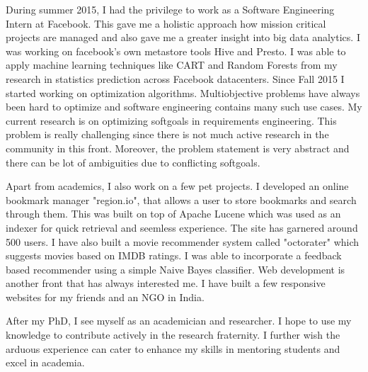 \documentclass{article}
\begin{document}
\bigskip
During summer 2015, I had the privilege to work as a Software Engineering Intern at Facebook. This gave me a holistic approach how mission critical projects are managed and also gave me a greater insight into big data analytics. I was working on facebook's own metastore tools Hive and Presto. I was able to apply machine learning techniques like CART and Random Forests from my research in statistics prediction across Facebook datacenters. Since Fall 2015 I started working on optimization algorithms. Multiobjective problems have always been hard to optimize and software engineering contains many such use cases. My current research is on optimizing softgoals in requirements engineering. This problem is really challenging since there is not much active research in the community in this front. Moreover, the problem statement is very abstract and there can be lot of ambiguities due to conflicting softgoals.

\bigskip
Apart from academics, I also work on a few pet projects. I developed an online bookmark manager "region.io", that allows a user to store bookmarks and search through them. This was built on top of Apache Lucene which was used as an indexer for quick retrieval and seemless experience. The site has garnered around 500 users. I have also built a movie recommender system called "octorater" which suggests movies based on IMDB ratings. I was able to incorporate a feedback based recommender using a simple Naive Bayes classifier. Web development is another front that has always interested me. I have built a few responsive websites for my friends and an NGO in India. 

\bigskip
After my PhD, I see myself as an academician and researcher. I hope to use my knowledge to contribute actively in the research fraternity. I further wish the arduous experience can cater to enhance my skills in mentoring students and excel in academia.
\end{document}
